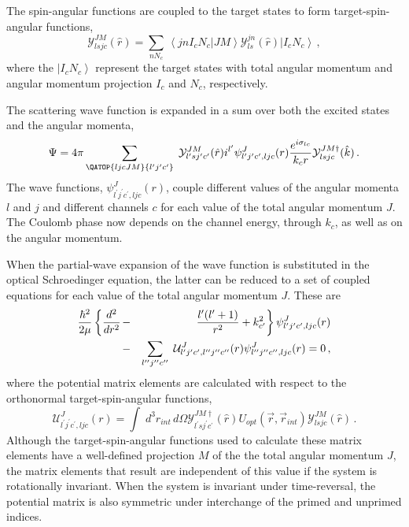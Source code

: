 The spin-angular functions are coupled to the target states to form
target-spin-angular functions,
\begin{equation}
{\mathcal{Y}}_{lsjc}^{JM}(%
\hat{r})=\sum_{nN_{c}}\,\left\langle jnI_{c}N_{c}|JM\right\rangle {\mathcal{Y%
}}_{ls}^{jn}(\hat{r})\left|I_{c}N_{c}\right\rangle \,,
\end{equation}
where the $\left|I_{c}N_{c}\right\rangle $ represent the target states with
total angular momentum and angular momentum projection $I_{c}$ and $N_{c}$,
respectively.

The scattering wave function is expanded in a sum over both the excited
states and the angular momenta,
\begin{equation}
\Psi=4\pi\sum_{{{\QATOP{ljcJM}{l^{\prime}j^{\prime}c^{\prime}}}}}\;{\mathcal{%
Y}}_{l^{\prime}sj^{\prime}c^{\prime}}^{JM}(\hat{r})i^{l^{\prime}}\psi_{l^{%
\prime}j^{\prime}c^{\prime},ljc}^{J}(r)\frac{e^{i\sigma_{lc}}}{k_{c}r}{%
\mathcal{Y}}_{lsjc}^{JM\dagger}(\hat{k})\,.  \label{cpar}
\end{equation}
The wave functions, $\psi_{l^{\prime}j^{\prime}c^{\prime},ljc}^{J}(r)$,
couple different values of the angular momenta $l$ and $j$ and different
channels $c$ for each value of the total angular momentum $J$. The Coulomb
phase now depends on the channel energy, through $k_{c}$, as well as on the
angular momentum.

When the partial-wave expansion of the wave function is substituted in the
optical Schroedinger equation, the latter can be reduced to a set of coupled
equations for each value of the total angular momentum $J$. These are
\begin{eqnarray}
\frac{\hbar^{2}}{2\mu}\left\{ \frac{d^{2}}{dr^{2}}\right. & - & \left.\frac{%
l^{\prime}(l^{\prime}+1)}{r^{2}}+k_{c^{\prime}}^{2}\right\}
\psi_{l^{\prime}j^{\prime}c^{\prime},ljc}^{J}(r) \\
& - & \sum_{l^{\prime\prime}j^{\prime\prime}c^{\prime\prime}}\;{\mathcal{U}}%
_{l^{\prime}j^{\prime}c^{\prime},l^{\prime\prime}j^{\prime\prime}c^{\prime%
\prime}}^{J}(r)\psi_{l^{\prime\prime}j^{\prime\prime}c^{\prime%
\prime},ljc}^{J}(r)=0\,,  \nonumber
\end{eqnarray}
where the potential matrix elements are calculated with respect to the
orthonormal target-spin-angular functions,
\begin{equation}
{\mathcal{U}}_{l^{\prime}j^{\prime}c^{\prime},ljc}^{J}(r)=\int\;
d^{3}r_{int}\, d\Omega{\mathcal{Y}}_{l^{\prime}sj^{\prime}c^{\prime}}^{JM%
\dagger}(\hat{r})U_{opt}(\vec{r},\vec{r}_{int}){\mathcal{Y}}_{lsjc}^{JM}(%
\hat{r})\,.  \label{uljc}
\end{equation}
Although the target-spin-angular functions used to calculate these matrix
elements have a well-defined projection $M$ of the the total angular
momentum $J$, the matrix elements that result are independent of this value
if the system is rotationally invariant. When the system is invariant under
time-reversal, the potential matrix is also symmetric under interchange of
the primed and unprimed indices.


